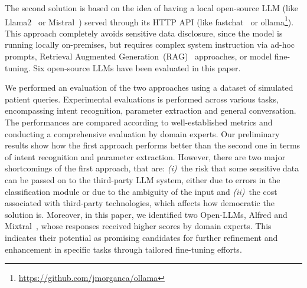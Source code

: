 The second solution is based on the idea of having a local open-source LLM (like Llama2~\cite{llama2} or Mistral~\cite{mistral}) served through its HTTP API (like fastchat~\cite{fastchat} or ollama\footnote{\url{https://github.com/jmorganca/ollama}}).
%
This approach completely avoids sensitive data disclosure, since the model is running locally on-premises, but requires complex system instruction via ad-hoc prompts, Retrieval Augmented Generation~(RAG)~\cite{rag} approaches, or model fine-tuning.
%
Six open-source LLMs have been evaluated in this paper.

We performed an evaluation of the two approaches using a dataset of simulated patient queries. 
%
Experimental evaluations is performed across various tasks, encompassing intent recognition, parameter extraction and general conversation. 
%
The performances are compared according to well-established metrics and conducting a comprehensive evaluation by domain experts.
%
Our preliminary results show how the first approach performs better than the second one in terms of intent recognition and parameter extraction. 
%
However, there are two major shortcomings of the first approach, that are: 
%
\emph{(i)}~the risk that some sensitive data can be passed on to the third-party LLM system, either due to errors in the classification module or due to the ambiguity of the input and
%
\emph{(ii)}~the cost associated with third-party technologies, which affects how democratic the solution is.
%
Moreover, in this paper, we identified two Open-LLMs, Alfred and Mixtral~\cite{mixtral}, whose responses received higher scores by domain experts.
%
This indicates their potential as promising candidates for further refinement and enhancement in specific tasks through tailored fine-tuning efforts.




